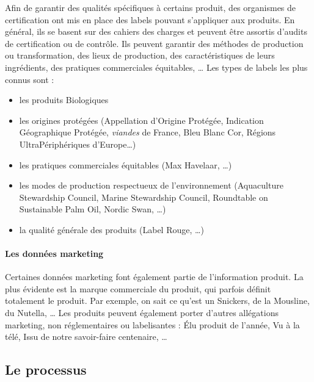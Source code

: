                 Afin de garantir des qualités spécifiques à certains produit, des organismes de certification ont mis en place des labels pouvant s'appliquer aux produits.
                En général, ils se basent sur des cahiers des charges et peuvent être assortis d'audits de certification ou de contrôle.
                Ils peuvent garantir des méthodes de production ou transformation, des lieux de production, des caractéristiques de leurs ingrédients, des pratiques commerciales équitables, \dots
                Les types de labels les plus connus sont :
                \begin{itemize}
                    \item les produits Biologiques
                    \item les origines protégées (Appellation d'Origine Protégée, Indication Géographique Protégée, \emph{viandes} de France, Bleu Blanc Cor, Régions UltraPériphériques d'Europe\dots)
                    \item les pratiques commerciales équitables (Max Havelaar, \dots)
                    \item les modes de production respectueux de l'environnement (Aquaculture Stewardship Council, Marine Stewardship Council, Roundtable on Sustainable Palm Oil, Nordic Swan, \dots)
                    \item la qualité \og générale \fg des produits (Label Rouge, \dots)
                \end{itemize}

                \paragraph{Les données marketing}

                Certaines données marketing font également partie de l'information produit.
                La plus évidente est la marque commerciale du produit, qui parfois définit totalement le produit.
                Par exemple, on sait ce qu'est un Snickers, de la Mousline, du Nutella, \dots
                Les produits peuvent également porter d'autres allégations marketing, non réglementaires ou labelisantes : \'{E}lu produit de l'année, Vu à la télé, Issu de notre savoir-faire centenaire, \dots                

        \subsection{Le processus}
        
